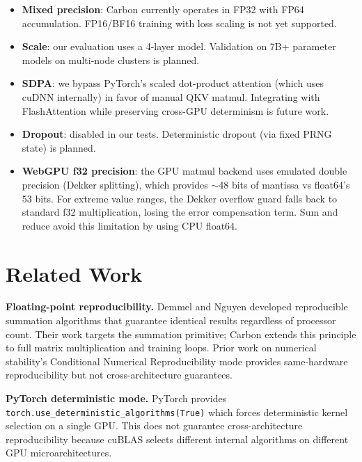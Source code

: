 \documentclass[11pt,a4paper]{article}
\begin{document}
\begin{itemize}
  \item \textbf{Mixed precision}: Carbon currently operates in FP32 with
    FP64 accumulation. FP16/BF16 training with loss scaling is not yet supported.
  \item \textbf{Scale}: our evaluation uses a 4-layer model. Validation on
    7B+ parameter models on multi-node clusters is planned.
  \item \textbf{SDPA}: we bypass PyTorch's scaled dot-product attention
    (which uses cuDNN internally) in favor of manual QKV matmul. Integrating
    with FlashAttention while preserving cross-GPU determinism is future work.
  \item \textbf{Dropout}: disabled in our tests. Deterministic dropout
    (via fixed PRNG state) is planned.
  \item \textbf{WebGPU f32 precision}: the GPU matmul backend uses emulated
    double precision (Dekker splitting), which provides $\sim$48 bits of
    mantissa vs float64's 53 bits. For extreme value ranges, the Dekker
    overflow guard falls back to standard f32 multiplication, losing the
    error compensation term. Sum and reduce avoid this limitation by using
    CPU float64.
\end{itemize}

\section{Related Work}

\textbf{Floating-point reproducibility.}
Demmel and Nguyen \cite{demmel2013ieee,demmel2015parallel} developed
reproducible summation algorithms that guarantee identical results
regardless of processor count. Their work targets the summation
primitive; Carbon extends this principle to full matrix multiplication
and training loops. Prior work on numerical stability's Conditional Numerical Reproducibility
mode \cite{higham2002accuracy} provides same-hardware reproducibility
but not cross-architecture guarantees.

\textbf{PyTorch deterministic mode.}
PyTorch \cite{paszke2019pytorch} provides
\texttt{torch.use\_deterministic\_algorithms(True)} which forces
deterministic kernel selection on a single GPU. This does not
guarantee cross-architecture reproducibility because cuBLAS
\cite{nvidia2023determinism} selects different internal algorithms
on different GPU microarchitectures.
\end{document}
